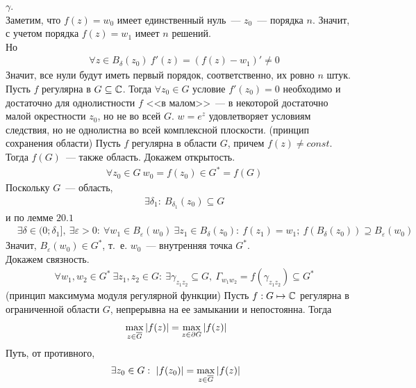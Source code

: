$\gamma$. 
\\
Заметим, что $f(z) = w_0$ имеет единственный нуль~--- $z_0$~--- порядка $n$.
Значит, с учетом порядка $f(z) = w_1$ имеет $n$ решений.
\\
Но 
\begin{align*}
& \forall z \in B_\delta(z_0) \ f'(z) = (f(z)-w_1)' \neq 0
\end{align*}
Значит, все нули будут иметь первый порядок, соответственно, их ровно $n$ штук.
\corollary
Пусть $f$ регулярна в $G \subseteq \mathbb{C}$. Тогда $\forall z_0 \in G$ условие
$f'(z_0) = 0$ необходимо и достаточно для однолистности $f$ <<в малом>>~--- в
некоторой достаточно малой окрестности $z_0$, но не во всей $G$.
\Example
$w=e^z$ удовлетворяет условиям следствия, но не однолистна во всей комплексной
плоскости.
\theorem (принцип сохранения области)
Пусть $f$ регулярна в области $G$, причем $f(z) \neq const$. Тогда $f(G)$~---
также область.
\pr
Докажем открытость.
\begin{align*}
& \forall z_0 \in G \ w_0 = f(z_0) \in G^* = f(G)
\end{align*}
Поскольку $G$~--- область, 
\begin{align*}
& \exists \delta_1: \ B_{\delta_1}(z_0) \subseteq G
\end{align*}
и по лемме $20.1$
\begin{align*}
& \exists \delta \in (0; \delta_1], \ \exists \varepsilon > 0: \ \forall w_1 \in B_\varepsilon (w_0) \ \exists z_1 \in B_\delta(z_0): \ f(z_1) = w_1; \ f(B_\delta(z_0)) \supseteq B_\varepsilon(w_0)
\end{align*}
Значит, $B_\varepsilon(w_0)\in G^*$, т.~е. $w_0$~--- внутренняя точка $G^*$.
\\
Докажем связность.
\begin{align*}
  & \forall w_1, w_2 \in G^* \ \exists z_1,z_2 \in G: \ \exists \gamma_{z_1z_2} \subseteq G, \ \Gamma_{w_1w_2} = f(\gamma_{z_1z_2}) \subseteq G^*
\end{align*}
\theorem (принцип максимума модуля регулярной функции)
Пусть $f: G \mapsto \mathbb{C}$ регулярна в ограниченной области $G$, непрерывна на ее
замыкании и непостоянна. Тогда
\begin{align*}
  & \max_{z \in \overline{G}} \left| f(z) \right| = \max_{z \in \partial G} \left| f(z) \right|
\end{align*}
\pr
Путь, от противного,
\begin{align*}
  & \exists z_0 \in G: \ \left| f(z_0) \right| = \max_{z \in \overline{G}}\left| f(z) \right|
\end{align*}
